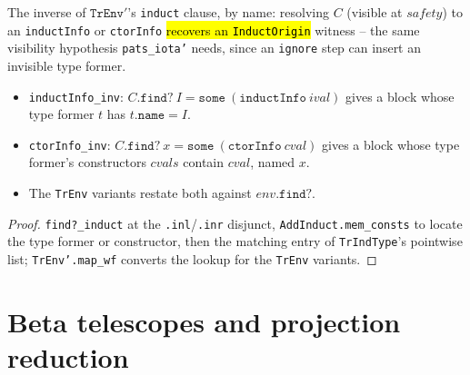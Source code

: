 \begin{lemma}
\label{family:tr-env-induct-ctor-info-inv}
\leanok
{}

 The inverse of $\mathtt{TrEnv}'$'s \texttt{induct} clause, by name:
resolving $C$ (visible at $safety$) to an \texttt{inductInfo} or \texttt{ctorInfo}
\hl{recovers an \texttt{InductOrigin}} witness -- the same visibility hypothesis
\texttt{pats\_iota'} needs, since an \texttt{ignore} step can insert an invisible type
former.
\begin{itemize}
\item \texttt{inductInfo\_inv}: $C.\mathtt{find?}\ I = \mathtt{some}\ (\mathtt{inductInfo}\
ival)$ gives a block whose type former $t$ has $t.\mathtt{name} = I$.
\item \texttt{ctorInfo\_inv}: $C.\mathtt{find?}\ x = \mathtt{some}\ (\mathtt{ctorInfo}\
cval)$ gives a block whose type former's constructors $cvals$ contain $cval$, named
$x$.
\item The \texttt{TrEnv} variants restate both against $env.\mathtt{find?}$.
\end{itemize}
\end{lemma}
\begin{proof}
\leanok
\lead{Idea} \texttt{find?\_induct} at the \texttt{.inl}/\texttt{.inr} disjunct,
\texttt{AddInduct.mem\_consts} to locate the type former or constructor, then the
matching entry of \texttt{TrIndType}'s pointwise list; \texttt{TrEnv'.map\_wf} converts
the lookup for the \texttt{TrEnv} variants.
\end{proof}

\section{Beta telescopes and projection reduction}

